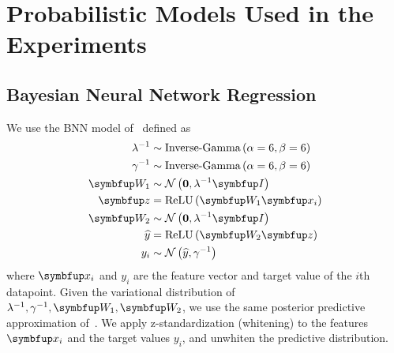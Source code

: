
\section{Probabilistic Models Used in the Experiments}
\subsection{Bayesian Neural Network Regression}\label{section:model_bnn}
We use the BNN model of~\citet{pmlr-v37-hernandez-lobatoc15} defined as
\begin{align*}
  \lambda^{-1} &\sim \text{Inverse-Gamma}\left(\alpha=6, \beta=6\right) \\
  \gamma^{-1}  &\sim \text{Inverse-Gamma}\left(\alpha=6, \beta=6\right) \\
  \mW_1       &\sim \mathcal{N}\left(\mathbf{0}, \lambda^{-1} \mI \right) \\
  \vz         &= \mathrm{ReLU}\left(\mW_1 \vx_i\right) \\
  \mW_2       &\sim \mathcal{N}\left(\mathbf{0}, \lambda^{-1} \mI \right) \\
  \widehat{y} &= \mathrm{ReLU}\left(\mW_2 \vz\right) \\
  y_i         &\sim \mathcal{N}\left(\widehat{y}, \gamma^{-1}\right)
\end{align*}
where \(\vx_i\) and \(y_i\) are the feature vector and target value of the \(i\)th datapoint.
Given the variational distribution of \(\lambda^{-1}, \gamma^{-1}, \mW_1, \mW_2\), we use the same posterior predictive approximation of~\citet{pmlr-v37-hernandez-lobatoc15}.
We apply z-standardization (whitening) to the features \(\vx_i\) and the target values \(y_i\), and unwhiten the predictive distribution.

